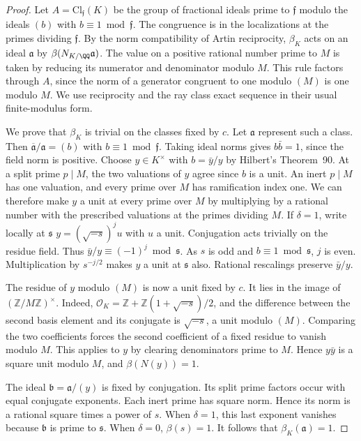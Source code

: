 \documentclass[a4paper,11pt]{article}
\theoremstyle{definition}
\theoremstyle{remark}
\newcommand{\ZZ}{\mathbb Z}\newcommand{\ord}{\operatorname{ord}}
\numberwithin{equation}{section}
\begin{document}
\begin{proof}
Let \(A=\mathrm{Cl}_{\mathfrak f}(K)\) be the group of fractional
ideals prime to \(\mathfrak f\) modulo the ideals \((b)\) with
\(b\equiv1\bmod\mathfrak f\). The congruence is in the
localizations at the primes dividing \(\mathfrak f\).
By the norm compatibility of Artin reciprocity, \(\beta_K\)
acts on an ideal \(\mathfrak a\) by
\(\beta(N_{K/\QQ}\mathfrak a)\). The value on a positive rational
number prime to \(M\) is taken by reducing its numerator and
denominator modulo \(M\). This rule factors through \(A\), since
the norm of a generator congruent to one modulo \((M)\) is one
modulo \(M\). We use reciprocity and the ray class exact
sequence in their usual finite-modulus form.~\cite{XI-VIII-rayclass444}

We prove that \(\beta_K\) is trivial on the classes fixed by \(c\).
Let \(\mathfrak a\) represent such a class. Then
\(\overline{\mathfrak a}/\mathfrak a=(b)\) with
\(b\equiv1\bmod\mathfrak f\). Taking ideal norms gives
\(b\bar b=1\), since the field norm is positive. Choose
\(y\in K^\times\) with \(b=\bar y/y\) by Hilbert's Theorem~90.
At a split prime \(p\mid M\), the two valuations of \(y\) agree
since \(b\) is a unit. An inert \(p\mid M\) has one valuation,
and every prime over \(M\) has ramification index one. We can
therefore make \(y\) a unit at every prime over \(M\) by
multiplying by a rational number with the prescribed valuations
at the primes dividing \(M\). If \(\delta=1\), write locally at
\(\mathfrak s\)
\(y=(\sqrt{-s})^j u\) with \(u\) a unit. Conjugation acts
trivially on the residue field. Thus
\(\bar y/y\equiv(-1)^j\bmod\mathfrak s\). As \(s\) is odd and
\(b\equiv1\bmod\mathfrak s\), \(j\) is even.
Multiplication by \(s^{-j/2}\) makes \(y\) a unit at
\(\mathfrak s\) also. Rational rescalings preserve \(\bar y/y\).

The residue of \(y\) modulo \((M)\) is now a unit fixed by \(c\).
It lies in the image of \((\ZZ/M\ZZ)^\times\). Indeed,
\(\mathcal O_K=\ZZ+\ZZ(1+\sqrt{-s})/2\), and the difference
between the second basis element and its conjugate is
\(\sqrt{-s}\), a unit modulo \((M)\). Comparing the two
coefficients forces the second coefficient of a fixed residue
to vanish modulo \(M\). This applies to \(y\) by clearing
denominators prime to \(M\). Hence \(y\bar y\) is a square unit
modulo \(M\), and \(\beta(N(y))=1\).

The ideal \(\mathfrak b=\mathfrak a/(y)\) is fixed by conjugation.
Its split prime factors occur with equal conjugate exponents.
Each inert prime has square norm. Hence its norm is a rational
square times a power of \(s\). When \(\delta=1\), this last
exponent vanishes because \(\mathfrak b\) is prime to
\(\mathfrak s\). When \(\delta=0\), \(\beta(s)=1\).
It follows that \(\beta_K(\mathfrak a)=1\).


\end{proof}
\end{document}
